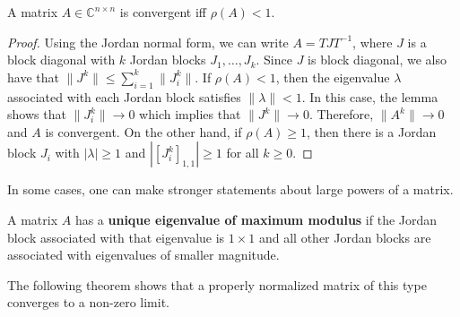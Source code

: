 \begin{theorem}
A matrix $A \in \mathbb{C}^{n\times n}$ is convergent iff $\rho(A)<1$.
\end{theorem}

\begin{proof}
Using the Jordan normal form, we can write $A = T J T^{-1}$, where $J$ is a block diagonal with $k$ Jordan blocks $J_1,\ldots,J_k$.
Since $J$ is block diagonal, we also have that $\| J^k \| \leq \sum_{i=1}^k \| J_i^k \|$.
If $\rho(A)<1$, then the eigenvalue $\lambda$ associated with each Jordan block satisfies $\| \lambda \| < 1$.
In this case, the lemma shows that $\| J_i^k \| \rightarrow 0$ which implies that $\| J^k \| \rightarrow 0$.
Therefore, $\| A^k \| \rightarrow 0$ and $A$ is convergent.
On the other hand, if $\rho(A) \geq 1$, then there is a Jordan block $J_i$ with $| \lambda | \geq 1$ and $| [ J_i^k ]_{1,1} | \geq 1$ for all $k\geq 0$.
\end{proof}

In some cases, one can make stronger statements about large powers of a matrix.

\begin{definition}
A matrix $A$ has a \textbf{unique eigenvalue of maximum modulus} if the Jordan block associated with that eigenvalue is $1\times 1$ and all other Jordan blocks are associated with eigenvalues of smaller magnitude.
\end{definition}

The following theorem shows that a properly normalized matrix of this type converges to a non-zero limit.

